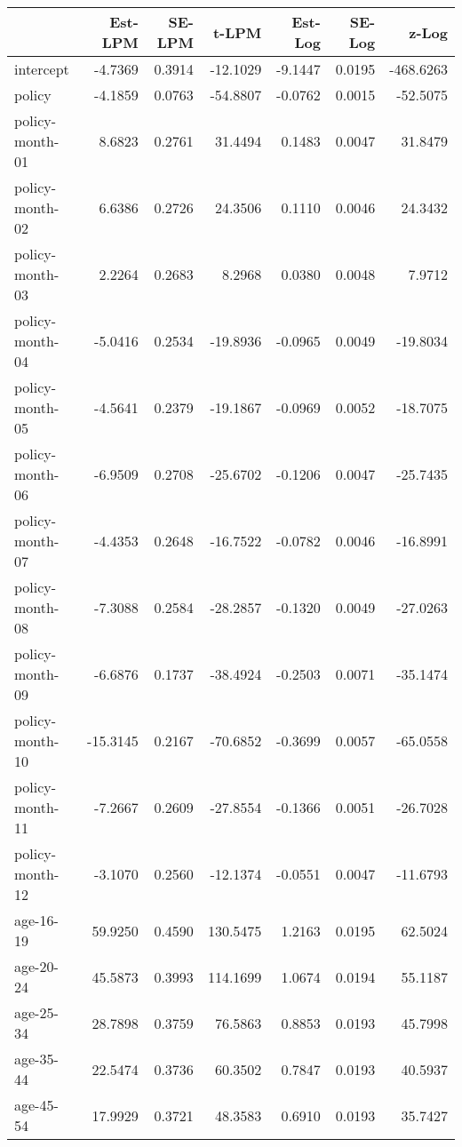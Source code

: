 \documentclass[10pt]{article}
\begin{document}

\begin{table}[ht]
\centering
\begin{tabular}{lrrrrrr}
  \hline
 & Est-LPM & SE-LPM & t-LPM & Est-Log & SE-Log & z-Log \\ 
  \hline
intercept & -4.7369 & 0.3914 & -12.1029 & -9.1447 & 0.0195 & -468.6263 \\ 
  policy & -4.1859 & 0.0763 & -54.8807 & -0.0762 & 0.0015 & -52.5075 \\ 
  policy-month-01 & 8.6823 & 0.2761 & 31.4494 & 0.1483 & 0.0047 & 31.8479 \\ 
  policy-month-02 & 6.6386 & 0.2726 & 24.3506 & 0.1110 & 0.0046 & 24.3432 \\ 
  policy-month-03 & 2.2264 & 0.2683 & 8.2968 & 0.0380 & 0.0048 & 7.9712 \\ 
  policy-month-04 & -5.0416 & 0.2534 & -19.8936 & -0.0965 & 0.0049 & -19.8034 \\ 
  policy-month-05 & -4.5641 & 0.2379 & -19.1867 & -0.0969 & 0.0052 & -18.7075 \\ 
  policy-month-06 & -6.9509 & 0.2708 & -25.6702 & -0.1206 & 0.0047 & -25.7435 \\ 
  policy-month-07 & -4.4353 & 0.2648 & -16.7522 & -0.0782 & 0.0046 & -16.8991 \\ 
  policy-month-08 & -7.3088 & 0.2584 & -28.2857 & -0.1320 & 0.0049 & -27.0263 \\ 
  policy-month-09 & -6.6876 & 0.1737 & -38.4924 & -0.2503 & 0.0071 & -35.1474 \\ 
  policy-month-10 & -15.3145 & 0.2167 & -70.6852 & -0.3699 & 0.0057 & -65.0558 \\ 
  policy-month-11 & -7.2667 & 0.2609 & -27.8554 & -0.1366 & 0.0051 & -26.7028 \\ 
  policy-month-12 & -3.1070 & 0.2560 & -12.1374 & -0.0551 & 0.0047 & -11.6793 \\ 
  age-16-19 & 59.9250 & 0.4590 & 130.5475 & 1.2163 & 0.0195 & 62.5024 \\ 
  age-20-24 & 45.5873 & 0.3993 & 114.1699 & 1.0674 & 0.0194 & 55.1187 \\ 
  age-25-34 & 28.7898 & 0.3759 & 76.5863 & 0.8853 & 0.0193 & 45.7998 \\ 
  age-35-44 & 22.5474 & 0.3736 & 60.3502 & 0.7847 & 0.0193 & 40.5937 \\ 
  age-45-54 & 17.9929 & 0.3721 & 48.3583 & 0.6910 & 0.0193 & 35.7427 \\ 

\end{tabular}
\end{table}
\end{document}

